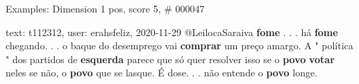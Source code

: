 \begin{frame}{Examples: Dimension 1 pos, score 5, \# 000047}
\footnotesize
\begin{exampleblock}{text: t112312, user: erahsfeliz, 2020-11-29}
@LeilocaSaraiva \textbf{fome} . . . há \textbf{fome} chegando. . . o baque do 
desemprego vai \textbf{comprar} um preço amargo. A " política " dos partidos de 
\textbf{esquerda} parece que só quer resolver isso se o \textbf{povo} 
\textbf{votar} neles se não, o \textbf{povo} que se lasque. É dose. . . não 
entende o \textbf{povo} longe. 
\end{exampleblock}
\end{frame}
